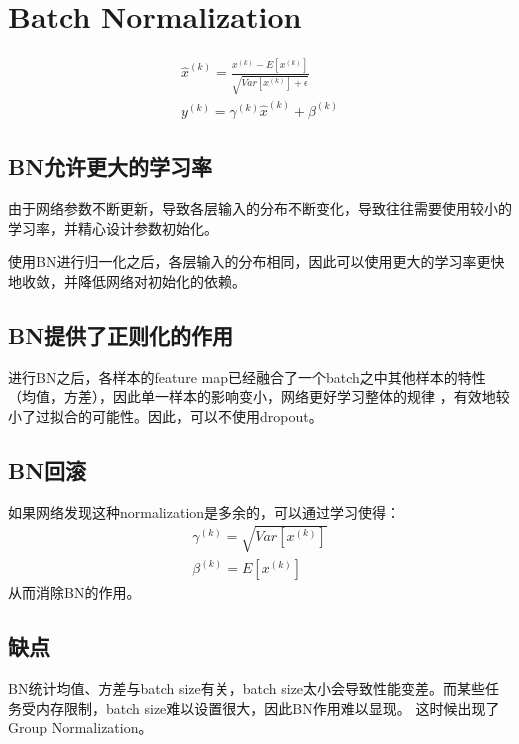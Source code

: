 \documentclass[letterpaper,10pt,english]{sphinxmanual}
\begin{document}
\section{Batch Normalization}
\label{\detokenize{deepLearning/03_batchnorm:batch-normalization}}\label{\detokenize{deepLearning/03_batchnorm::doc}}\begin{equation*}
\begin{split}\hat{x}^{(k)} = \frac{x^{(k)} - E[x^{(k)}]}{\sqrt{Var[x^{{(k)}}] + \epsilon}} \\
y^{(k)} = \gamma^{(k)} \hat{x}^{(k)} + \beta^{(k)}\end{split}
\end{equation*}

\subsection{BN允许更大的学习率}
\label{\detokenize{deepLearning/03_batchnorm:bn}}
由于网络参数不断更新，导致各层输入的分布不断变化，导致往往需要使用较小的学习率，并精心设计参数初始化。

使用BN进行归一化之后，各层输入的分布相同，因此可以使用更大的学习率更快地收敛，并降低网络对初始化的依赖。


\subsection{BN提供了正则化的作用}
\label{\detokenize{deepLearning/03_batchnorm:id1}}
进行BN之后，各样本的feature map已经融合了一个batch之中其他样本的特性（均值，方差），因此单一样本的影响变小，网络更好学习整体的规律
，有效地较小了过拟合的可能性。因此，可以不使用dropout。


\subsection{BN回滚}
\label{\detokenize{deepLearning/03_batchnorm:id2}}
如果网络发现这种normalization是多余的，可以通过学习使得：
\begin{equation*}
\begin{split}\gamma^{(k)} = \sqrt{Var[x^{{(k)}}]} \\
\beta^{(k)} = E[x^{(k)}]\end{split}
\end{equation*}
从而消除BN的作用。


\subsection{缺点}
\label{\detokenize{deepLearning/03_batchnorm:id3}}
BN统计均值、方差与batch size有关，batch size太小会导致性能变差。而某些任务受内存限制，batch size难以设置很大，因此BN作用难以显现。
这时候出现了Group Normalization。
\end{document}
